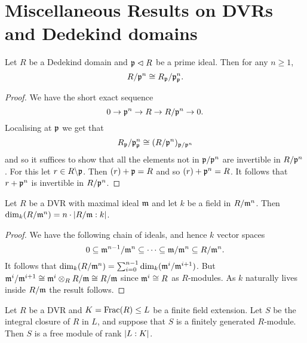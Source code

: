 \documentclass{memoir}
\begin{document}
\section{Miscellaneous Results on DVRs and Dedekind domains}
\begin{proposition}
    Let $R$ be a Dedekind domain and $\mathfrak{p}\vartriangleleft R$ be a prime ideal.
    Then for any $n\ge 1 $, 
    \begin{equation}
        R/\mathfrak{p}^n \cong R_{\mathfrak{p}}/\mathfrak{p}_{\mathfrak{p}}^n.
    \end{equation}
\end{proposition}
\begin{proof}
    We have the short exact sequence
    \begin{equation}
        0 \to \mathfrak{p}^n \to R \to R/\mathfrak{p}^n \to 0.
    \end{equation}
    Localising at $\mathfrak{p}$ we get that 
    \begin{equation}
        R_{\mathfrak{p}}/\mathfrak{p}_{\mathfrak{p}}^n \cong (R/\mathfrak{p}^n)_{\mathfrak{p}/\mathfrak{p}^n}
    \end{equation}
    and so it suffices to show that all the elements not in $\mathfrak{p}/\mathfrak{p}^n$ are invertible in $R/\mathfrak{p}^n$.
    For this let $r\in R\backslash \mathfrak{p}$.
    Then $(r) + \mathfrak{p} = R$ and so $(r) + \mathfrak{p}^n = R$.
    It follows that $r+\mathfrak{p}^n$ is invertible in $R/\mathfrak{p}^n$.
\end{proof}
\begin{proposition}
    \label{prop:q_dim}
    Let $R$ be a DVR with maximal ideal $\mathfrak{m}$ and let $k$ be a field in $R/\mathfrak{m}^n$.
    Then $\dim_k(R/\mathfrak{m}^n) = n\cdot\lvert R/\mathfrak{m}:k\rvert$.
\end{proposition}
\begin{proof}
    We have the following chain of ideals, and hence $k$ vector spaces
    \begin{equation}
        0 \subseteq \mathfrak{m}^{n-1}/\mathfrak{m}^n \subseteq \cdots \subseteq \mathfrak{m}/\mathfrak{m}^n \subseteq R/\mathfrak{m}^n.
    \end{equation}
    It follows that $\dim_k(R/\mathfrak{m}^n) = \sum_{i = 0}^{n-1} \dim_k(\mathfrak{m}^i/\mathfrak{m}^{i+1})$.
    But $\mathfrak{m}^i/\mathfrak{m}^{i+1} \cong \mathfrak{m}^i\otimes_R R/\mathfrak{m} \cong R/\mathfrak{m}$ since $\mathfrak{m}^i\cong R$ as $R$-modules.
    As $k$ naturally lives inside $R/\mathfrak{m}$ the result follows.
\end{proof}
\begin{proposition}
    \label{prop:DVR_closure}
    Let $R$ be a DVR and $K = \text{Frac}(R) \le L$ be a finite field extension.
    Let $S$ be the integral closure of $R$ in $L$, and suppose that $S$ is a finitely generated $R$-module.
    Then $S$ is a free module of rank $\lvert L:K\rvert$.
\end{proposition}
\end{document}
